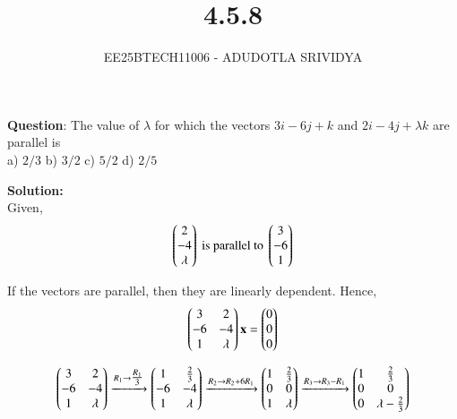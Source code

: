 \documentclass[journal]{IEEEtran}
\begin{document}

\vspace{3cm}

\title{4.5.8}
\author{EE25BTECH11006 - ADUDOTLA SRIVIDYA}
{\let\newpage\relax\maketitle}

\renewcommand{\thefigure}{\theenumi}
\renewcommand{\thetable}{\theenumi}
\setlength{\intextsep}{10pt}

\textbf{Question}: The value of $\lambda$ for which the vectors $3i-6j+k$ and $2i-4j+\lambda k$ are parallel is\\
a) $2/3$ \quad
b) $3/2$ \quad
c) $5/2$ \quad
d) $2/5$ \quad

\textbf{Solution:}\\
Given,
\begin{align}
    \begin{pmatrix}2\\-4\\ \lambda \end{pmatrix} \text{ is parallel to }  \begin{pmatrix}3\\-6\\1\end{pmatrix}
\end{align}

If the vectors are parallel, then they are linearly dependent. Hence,
\begin{align}
    \begin{pmatrix}3 & 2 \\ -6 & -4 \\ 1 & \lambda\end{pmatrix}\mathbf{x} = \begin{pmatrix}0 \\ 0 \\ 0\end{pmatrix}
\end{align}

\begin{align}
\begin{pmatrix}3 & 2 \\ -6 & -4 \\ 1 & \lambda\end{pmatrix}
\xrightarrow{R_1 \rightarrow \tfrac{R_1}{3}}
\begin{pmatrix}1 & \tfrac{2}{3} \\ -6 & -4 \\ 1 & \lambda\end{pmatrix}
\xrightarrow{R_2 \rightarrow R_2 + 6R_1}
\begin{pmatrix}1 & \tfrac{2}{3} \\ 0 & 0 \\ 1 & \lambda\end{pmatrix}
\xrightarrow{R_3 \rightarrow R_3 - R_1}
\begin{pmatrix}1 & \tfrac{2}{3} \\ 0 & 0 \\ 0 & \lambda - \tfrac{2}{3}\end{pmatrix}
\end{align}
\end{document}
